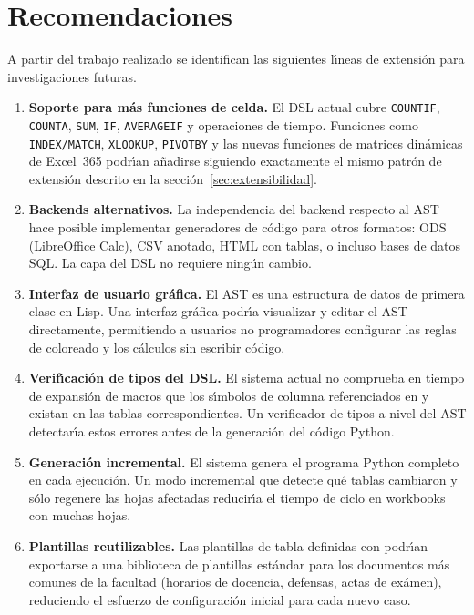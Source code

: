 \chapter*{Recomendaciones}

A partir del trabajo realizado se identifican las siguientes l\'{\i}neas de
extensi\'on para investigaciones futuras.

\begin{enumerate}

  \item \textbf{Soporte para m\'as funciones de celda.}  El DSL actual cubre
    \texttt{COUNTIF}, \texttt{COUNTA}, \texttt{SUM}, \texttt{IF},
    \texttt{AVERAGEIF} y operaciones de tiempo.  Funciones como
    \texttt{INDEX/MATCH}, \texttt{XLOOKUP}, \texttt{PIVOTBY} y las nuevas
    funciones de matrices din\'amicas de Excel~365 podr\'{\i}an a\~nadirse
    siguiendo exactamente el mismo patr\'on de extensi\'on descrito en la
    secci\'on~\ref{sec:extensibilidad}.

  \item \textbf{Backends alternativos.}  La independencia del backend respecto
    al AST hace posible implementar generadores de c\'odigo para otros
    formatos: ODS (LibreOffice Calc), CSV anotado, HTML con tablas,
    o incluso bases de datos SQL.  La capa del DSL no requiere ning\'un cambio.

  \item \textbf{Interfaz de usuario gr\'afica.}  El AST es una estructura de
    datos de primera clase en Lisp.  Una interfaz gr\'afica podr\'{\i}a visualizar
    y editar el AST directamente, permitiendo a usuarios no programadores
    configurar las reglas de coloreado y los c\'alculos sin escribir c\'odigo.

  \item \textbf{Verif\'{\i}caci\'on de tipos del DSL.}  El sistema actual no
    comprueba en tiempo de expansi\'on de macros que los s\'{\i}mbolos de columna
    referenciados en  y  existan en las tablas
    correspondientes.  Un verificador de tipos a nivel del AST detectar\'{\i}a
    estos errores antes de la generaci\'on del c\'odigo Python.

  \item \textbf{Generaci\'on incremental.}  El sistema genera el programa
    Python completo en cada ejecuci\'on.  Un modo incremental que detecte
    qu\'e tablas cambiaron y s\'olo regenere las hojas afectadas reducir\'{\i}a
    el tiempo de ciclo en workbooks con muchas hojas.

  \item \textbf{Plantillas reutilizables.}  Las plantillas de tabla definidas
    con  podr\'{\i}an exportarse a una biblioteca de plantillas
    est\'andar para los documentos m\'as comunes de la facultad (horarios de
    docencia, defensas, actas de ex\'amen), reduciendo el esfuerzo de
    configuraci\'on inicial para cada nuevo caso.

\end{enumerate}
